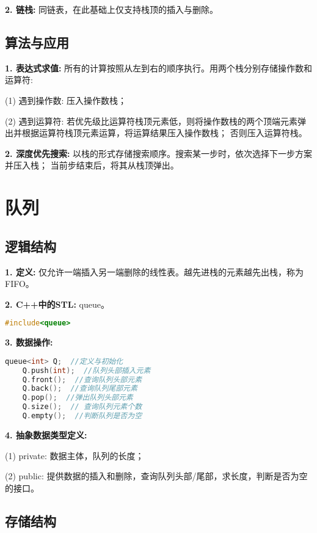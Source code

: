 \textbf{2. 链栈: }同链表，在此基础上仅支持栈顶的插入与删除。

\subsection{算法与应用}

\textbf{1. 表达式求值: }所有的计算按照从左到右的顺序执行。用两个栈分别存储操作数和运算符: 

(1) 遇到操作数: 压入操作数栈；

(2) 遇到运算符: 若优先级比运算符栈顶元素低，则将操作数栈的两个顶端元素弹出并根据运算符栈顶元素运算，将运算结果压入操作数栈； 否则压入运算符栈。

\textbf{2. 深度优先搜索: }以栈的形式存储搜索顺序。搜索某一步时，依次选择下一步方案并压入栈； 当前步结束后，将其从栈顶弹出。

\section{队列}

\subsection{逻辑结构}

\textbf{1. 定义: }仅允许一端插入另一端删除的线性表。越先进栈的元素越先出栈，称为FIFO。

\textbf{2. C++中的STL: }queue。

\begin{lstlisting}[language=C++]
    #include<queue>
\end{lstlisting}

\textbf{3. 数据操作: }

\begin{lstlisting}[language=C++]
    queue<int> Q;  //定义与初始化
    Q.push(int);  //队列头部插入元素
    Q.front();  //查询队列头部元素
    Q.back();  //查询队列尾部元素
    Q.pop();  //弹出队列头部元素
    Q.size();  // 查询队列元素个数
    Q.empty();  //判断队列是否为空
\end{lstlisting}

\textbf{4. 抽象数据类型定义: }

(1) private: 数据主体，队列的长度；

(2) public: 提供数据的插入和删除，查询队列头部/尾部，求长度，判断是否为空的接口。

\subsection{存储结构}

